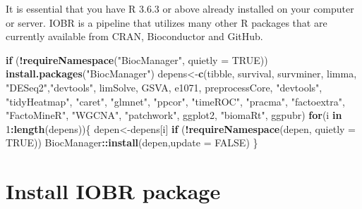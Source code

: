 \documentclass[
  12pt,
]{book}
\newenvironment{Shaded}{\begin{snugshade}}{\end{snugshade}}
\newcommand{\AttributeTok}[1]{\textcolor[rgb]{0.13,0.29,0.53}{#1}}
\newcommand{\ConstantTok}[1]{\textcolor[rgb]{0.56,0.35,0.01}{#1}}
\newcommand{\ControlFlowTok}[1]{\textcolor[rgb]{0.13,0.29,0.53}{\textbf{#1}}}
\newcommand{\DecValTok}[1]{\textcolor[rgb]{0.00,0.00,0.81}{#1}}
\newcommand{\FunctionTok}[1]{\textcolor[rgb]{0.13,0.29,0.53}{\textbf{#1}}}
\newcommand{\NormalTok}[1]{#1}
\newcommand{\OtherTok}[1]{\textcolor[rgb]{0.56,0.35,0.01}{#1}}
\newcommand{\SpecialCharTok}[1]{\textcolor[rgb]{0.81,0.36,0.00}{\textbf{#1}}}
\newcommand{\StringTok}[1]{\textcolor[rgb]{0.31,0.60,0.02}{#1}}
\begin{document}
It is essential that you have R 3.6.3 or above already installed on your computer or server. IOBR is a pipeline that utilizes many other R packages that are currently available from CRAN, Bioconductor and GitHub.

\begin{Shaded}
\begin{Highlighting}[]
\ControlFlowTok{if}\NormalTok{ (}\SpecialCharTok{!}\FunctionTok{requireNamespace}\NormalTok{(}\StringTok{"BiocManager"}\NormalTok{, }\AttributeTok{quietly =} \ConstantTok{TRUE}\NormalTok{)) }\FunctionTok{install.packages}\NormalTok{(}\StringTok{"BiocManager"}\NormalTok{)}
\NormalTok{depens}\OtherTok{\textless{}{-}}\FunctionTok{c}\NormalTok{(}\StringTok{\textquotesingle{}tibble\textquotesingle{}}\NormalTok{, }\StringTok{\textquotesingle{}survival\textquotesingle{}}\NormalTok{, }\StringTok{\textquotesingle{}survminer\textquotesingle{}}\NormalTok{, }\StringTok{\textquotesingle{}limma\textquotesingle{}}\NormalTok{, }\StringTok{"DESeq2"}\NormalTok{,}\StringTok{"devtools"}\NormalTok{, }\StringTok{\textquotesingle{}limSolve\textquotesingle{}}\NormalTok{, }\StringTok{\textquotesingle{}GSVA\textquotesingle{}}\NormalTok{, }\StringTok{\textquotesingle{}e1071\textquotesingle{}}\NormalTok{, }\StringTok{\textquotesingle{}preprocessCore\textquotesingle{}}\NormalTok{, }
          \StringTok{"devtools"}\NormalTok{, }\StringTok{"tidyHeatmap"}\NormalTok{, }\StringTok{"caret"}\NormalTok{, }\StringTok{"glmnet"}\NormalTok{, }\StringTok{"ppcor"}\NormalTok{,  }\StringTok{"timeROC"}\NormalTok{, }\StringTok{"pracma"}\NormalTok{, }\StringTok{"factoextra"}\NormalTok{, }
          \StringTok{"FactoMineR"}\NormalTok{, }\StringTok{"WGCNA"}\NormalTok{, }\StringTok{"patchwork"}\NormalTok{, }\StringTok{\textquotesingle{}ggplot2\textquotesingle{}}\NormalTok{, }\StringTok{"biomaRt"}\NormalTok{, }\StringTok{\textquotesingle{}ggpubr\textquotesingle{}}\NormalTok{)}
\ControlFlowTok{for}\NormalTok{(i }\ControlFlowTok{in} \DecValTok{1}\SpecialCharTok{:}\FunctionTok{length}\NormalTok{(depens))\{}
\NormalTok{  depen}\OtherTok{\textless{}{-}}\NormalTok{depens[i]}
  \ControlFlowTok{if}\NormalTok{ (}\SpecialCharTok{!}\FunctionTok{requireNamespace}\NormalTok{(depen, }\AttributeTok{quietly =} \ConstantTok{TRUE}\NormalTok{))  BiocManager}\SpecialCharTok{::}\FunctionTok{install}\NormalTok{(depen,}\AttributeTok{update =} \ConstantTok{FALSE}\NormalTok{)}
\NormalTok{\}}
\end{Highlighting}
\end{Shaded}

\hypertarget{install-iobr-package}{%
\section{Install IOBR package}\label{install-iobr-package}}
\end{document}
